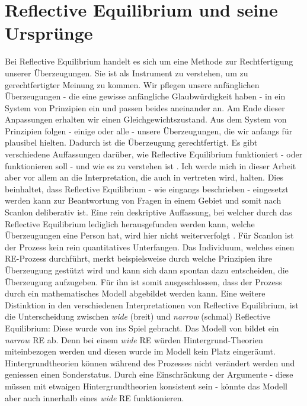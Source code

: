 \documentclass{article}
\begin{document}
\section{Reflective Equilibrium und seine Ursprünge}

Bei Reflective Equilibrium handelt es sich um eine Methode zur Rechtfertigung unserer Überzeugungen. Sie ist als Instrument zu verstehen, um zu gerechtfertigter Meinung zu kommen. Wir pflegen unsere anfänglichen Überzeugungen - die eine gewisse anfängliche Glaubwürdigkeit haben - in ein System von Prinzipien ein und passen beides aneinander an. Am Ende dieser Anpassungen erhalten wir einen Gleichgewichtszustand. Aus dem System von Prinzipien folgen - einige oder alle - unsere Überzeugungen, die wir anfangs für plausibel hielten. Dadurch ist die Überzeugung gerechtfertigt. Es gibt verschiedene Auffassungen darüber, wie Reflective Equilibrium funktioniert - oder funktionieren soll - und wie es zu verstehen ist \autocite{sep-reflective-equilibrium}.
Ich werde mich in dieser Arbeit aber vor allem an die Interpretation, die auch in \cite{beisbart_making_2021} vertreten wird, halten. Dies beinhaltet, dass Reflective Equilibrium - wie eingangs beschrieben - eingesetzt werden kann zur Beantwortung von Fragen in einem Gebiet und somit nach Scanlon deliberativ ist. Eine rein deskriptive Auffassung, bei welcher durch das Reflective Equilibrium lediglich herausgefunden werden kann, welche Überzeugungen eine Person hat, wird hier nicht weiterverfolgt \autocite[S.~143]{freeman_rawls_2002}. Für Scanlon ist der Prozess kein rein quantitatives Unterfangen. Das Individuum, welches einen RE-Prozess durchführt, merkt beispielsweise durch welche Prinzipien ihre Überzeugung gestützt wird und kann sich dann spontan dazu entscheiden, die Überzeugung aufzugeben. Für ihn ist somit ausgeschlossen, dass der Prozess durch ein mathematisches Modell abgebildet werden kann. \autocite[S.~148]{freeman_rawls_2002}
Eine weitere Distinktion in den verschiedenen Interpretationen von Reflective Equilibrium, ist die Unterscheidung zwischen \textit{wide} (breit) und \textit{narrow} (schmal) Reflective Equilibrium: Diese wurde von \citeauthor{daniels_wide_1996} ins Spiel gebracht. Das Modell von \citeauthor{beisbart_making_2021} bildet ein \textit{narrow} RE ab. Denn bei einem \textit{wide} RE würden Hintergrund-Theorien miteinbezogen werden und diesen wurde im Modell kein Platz eingeräumt. Hintergrundtheorien können während des Prozesses nicht verändert werden und geniessen einen Sonderstatus. Durch eine Einschränkung der Argumente - diese müssen mit etwaigen Hintergrundtheorien konsistent sein - könnte das Modell aber auch innerhalb eines \textit{wide} RE funktionieren. \autocite[S.~459]{beisbart_making_2021}
\end{document}
